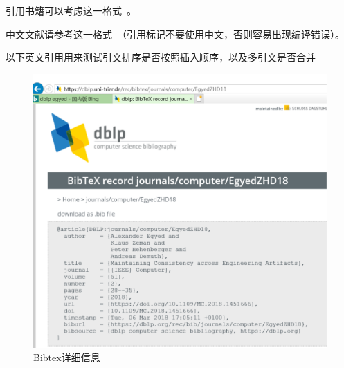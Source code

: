 引用书籍可以考虑这一格式~\cite{Pohl2010Requirements}。

中文文献请参考这一格式~\cite{cyg2006}（引用标记不要使用中文，否则容易出现编译错误）。

以下英文引用用来测试引文排序是否按照插入顺序，以及多引文是否合并~\cite{DBLP:journals/computer/EgyedZHD18, DBLP:journals/ml/TingZCZWZ19}

\begin{figure}[htb]
  \centering
  \includegraphics[width=5in]{figure/chapter7/bibtexDetail.pdf}
  \caption{Bibtex详细信息}
  \label{fig:bibtexDetailCH7}
\end{figure}

